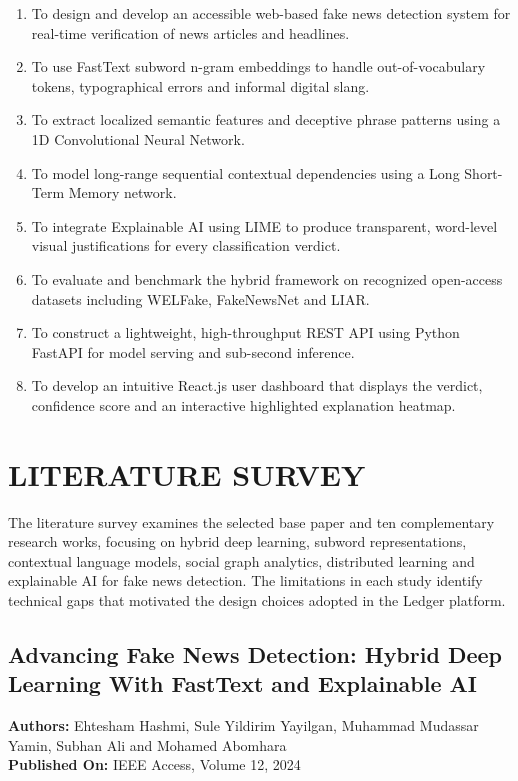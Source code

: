 \documentclass[12pt,a4paper,oneside]{report}
\begin{document}
\begin{enumerate}[label=\arabic*., leftmargin=*, itemsep=2pt]
  \item To design and develop an accessible web-based fake news detection system for
        real-time verification of news articles and headlines.
  \item To use FastText subword n-gram embeddings to handle out-of-vocabulary tokens,
        typographical errors and informal digital slang.
  \item To extract localized semantic features and deceptive phrase patterns using a
        1D Convolutional Neural Network.
  \item To model long-range sequential contextual dependencies using a Long Short-Term
        Memory network.
  \item To integrate Explainable AI using LIME to produce transparent, word-level
        visual justifications for every classification verdict.
  \item To evaluate and benchmark the hybrid framework on recognized open-access
        datasets including WELFake, FakeNewsNet and LIAR.
  \item To construct a lightweight, high-throughput REST API using Python FastAPI for
        model serving and sub-second inference.
  \item To develop an intuitive React.js user dashboard that displays the verdict,
        confidence score and an interactive highlighted explanation heatmap.
\end{enumerate}

\chapter{LITERATURE SURVEY}

The literature survey examines the selected base paper and ten complementary research
works, focusing on hybrid deep learning, subword representations, contextual language
models, social graph analytics, distributed learning and explainable AI for fake news
detection. The limitations in each study identify technical gaps that motivated the
design choices adopted in the Ledger platform.

\section{Advancing Fake News Detection: Hybrid Deep Learning With FastText and Explainable AI}
\textbf{Authors:} Ehtesham Hashmi, Sule Yildirim Yayilgan, Muhammad Mudassar Yamin, Subhan Ali and Mohamed Abomhara\\
\textbf{Published On:} IEEE Access, Volume 12, 2024
\end{document}

